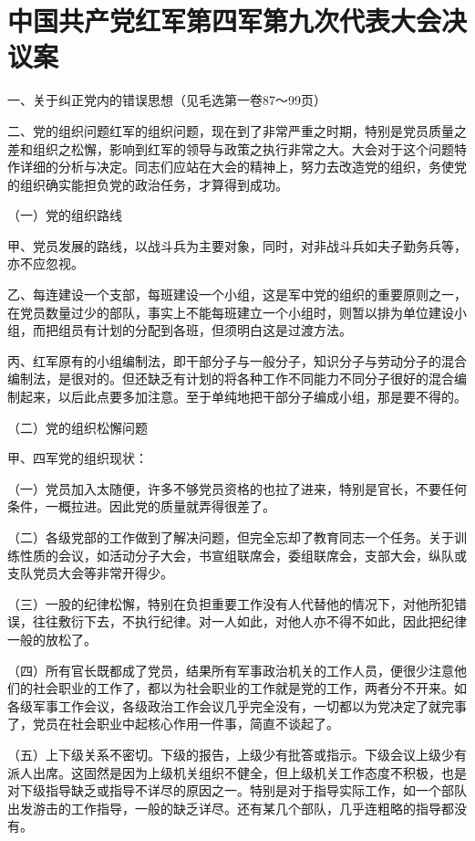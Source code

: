 \section[中国共产党红军第四军第九次代表大会决议案（一九二九年）]{中国共产党红军第四军第九次代表大会决议案}


一、关于纠正党内的错误思想（见毛选第一卷87～99页）

二、党的组织问题红军的组织问题，现在到了非常严重之时期，特别是党员质量之差和组织之松懈，影响到红军的领导与政策之执行非常之大。大会对于这个问题特作详细的分析与决定。同志们应站在大会的精神上，努力去改造党的组织，务使党的组织确实能担负党的政治任务，才算得到成功。

（一）党的组织路线

甲、党员发展的路线，以战斗兵为主要对象，同时，对非战斗兵如夫子勤务兵等，亦不应忽视。

乙、每连建设一个支部，每班建设一个小组，这是军中党的组织的重要原则之一，在党员数量过少的部队，事实上不能每班建立一个小组时，则暂以排为单位建设小组，而把组员有计划的分配到各班，但须明白这是过渡方法。

丙、红军原有的小组编制法，即干部分子与一般分子，知识分子与劳动分子的混合编制法，是很对的。但还缺乏有计划的将各种工作不同能力不同分子很好的混合编制起来，以后此点要多加注意。至于单纯地把干部分子编成小组，那是要不得的。

（二）党的组织松懈问题

甲、四军党的组织现状：

（一）党员加入太随便，许多不够党员资格的也拉了进来，特别是官长，不要任何条件，一概拉进。因此党的质量就弄得很差了。

（二）各级党部的工作做到了解决问题，但完全忘却了教育同志一个任务。关于训练性质的会议，如活动分子大会，书宣组联席会，委组联席会，支部大会，纵队或支队党员大会等非常开得少。

（三）一股的纪律松懈，特别在负担重要工作没有人代替他的情况下，对他所犯错误，往往敷衍下去，不执行纪律。对一人如此，对他人亦不得不如此，因此把纪律一般的放松了。

（四）所有官长既都成了党员，结果所有军事政治机关的工作人员，便很少注意他们的社会职业的工作了，都以为社会职业的工作就是党的工作，两者分不开来。如各级军事工作会议，各级政治工作会议几乎完全没有，一切都以为党决定了就完事了，党员在社会职业中起核心作用一件事，简直不谈起了。

（五）上下级关系不密切。下级的报告，上级少有批答或指示。下级会议上级少有派人出席。这固然是因为上级机关组织不健全，但上级机关工作态度不积极，也是对下级指导缺乏或指导不详尽的原因之一。特别是对于指导实际工作，如一个部队出发游击的工作指导，一般的缺乏详尽。还有某几个部队，几乎连粗略的指导都没有。

